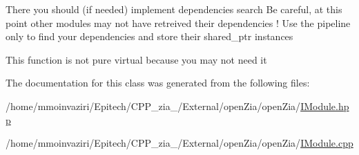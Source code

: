 There you should (if needed) implement dependencies search Be careful, at this point other modules may not have retreived their dependencies ! Use the pipeline only to find your dependencies and store their shared\+\_\+ptr instances

This function is not pure virtual because you may not need it 

The documentation for this class was generated from the following files\+:\begin{DoxyCompactItemize}
\item 
/home/mmoinvaziri/\+Epitech/\+C\+P\+P\+\_\+zia\+\_/\+External/open\+Zia/open\+Zia/\mbox{\hyperlink{_i_module_8hpp}{I\+Module.\+hpp}}\item 
/home/mmoinvaziri/\+Epitech/\+C\+P\+P\+\_\+zia\+\_/\+External/open\+Zia/open\+Zia/\mbox{\hyperlink{_i_module_8cpp}{I\+Module.\+cpp}}\end{DoxyCompactItemize}
